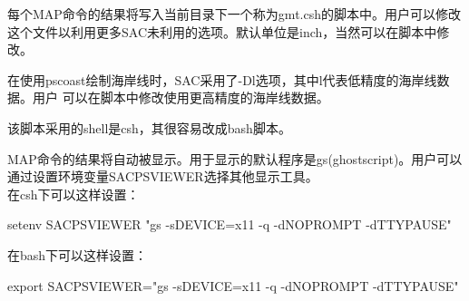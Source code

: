 每个MAP命令的结果将写入当前目录下一个称为gmt.csh的脚本中。用户可以修改这个文件以利用更多SAC未利用的选项。默认单位是inch，当然可以在脚本中修改。

在使用pscoast绘制海岸线时，SAC采用了-Dl选项，其中l代表低精度的海岸线数据。用户
可以在脚本中修改使用更高精度的海岸线数据。

该脚本采用的shell是csh，其很容易改成bash脚本。

MAP命令的结果将自动被显示。用于显示的默认程序是gs(ghostscript)。用户可以通过设置环境变量SACPSVIEWER选择其他显示工具。\\
在csh下可以这样设置：
\begin{SACCode}
setenv SACPSVIEWER "gs -sDEVICE=x11 -q -dNOPROMPT -dTTYPAUSE"
\end{SACCode}
在bash下可以这样设置：
\begin{SACCode}
export SACPSVIEWER="gs -sDEVICE=x11 -q -dNOPROMPT -dTTYPAUSE"
\end{SACCode}
